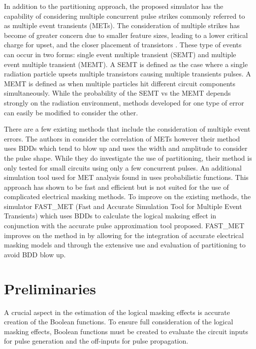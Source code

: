 In addition to the partitioning approach, the proposed simulator has the capability of considering multiple concurrent pulse strikes commonly referred to as multiple event transients (METs). The consideration of multiple strikes has become of greater concern due to smaller feature sizes, leading to a lower critical charge for upset, and the closer placement of transistors \cite{Rossi2005}. These type of events can occur in two forms: single event multiple transient (SEMT) and multiple event multiple transient (MEMT). A SEMT is defined as the case where a single radiation particle upsets multiple transistors causing multiple transients pulses. A MEMT is defined as when multiple particles hit different circuit components simultaneously. While the probability of the SEMT vs the MEMT depends strongly on the radiation environment, methods developed for one type of error can easily be modified to consider the other. 

There are a few existing methods that include the consideration of multiple event errors. The authors in \cite{METSys} consider the correlation of METs however their method uses BDDs which tend to blow up and uses the width and amplitude to consider the pulse shape. While they do investigate the use of partitioning, their method is only tested for small circuits using only a few concurrent pulses. An additional simulation tool used for MET analysis found in \cite{Fazeli2011} uses probabilistic functions. This approach has shown to be fast and efficient but is not suited for the use of complicated electrical masking methods. To improve on the existing methods, the simulator FAST\_MET (Fast and Accurate Simulation Tool for Multiple Event Transients) which uses BDDs to calculate the logical maksing effect in conjunction with the accurate pulse approximation tool proposed. FAST\_MET improves on the method in \cite{METSys} by allowing for the integration of accurate electrical masking models and through the extensive use and evaluation of partitioning to avoid BDD blow up.    

\section{Preliminaries} \label{ch3:prelim}

A crucial aspect in the estimation of the logical masking effects is accurate creation of the Boolean functions. To ensure full consideration of the logical masking effects, Boolean functions must be created to evaluate the circuit inputs for pulse generation and the off-inputs for pulse propagation.

